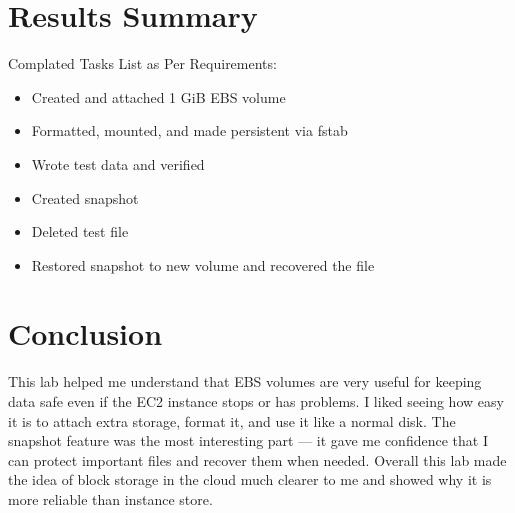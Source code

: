 \documentclass[12pt,a4paper]{article}
\begin{document}
\section*{Results Summary}
Complated Tasks List as Per Requirements:
\begin{itemize}
    \item Created and attached 1 GiB EBS volume
    \item Formatted, mounted, and made persistent via fstab
    \item Wrote test data and verified
    \item Created snapshot
    \item Deleted test file
    \item Restored snapshot to new volume and recovered the file
\end{itemize}
\section*{Conclusion}
This lab helped me understand that EBS volumes are very useful for keeping data safe even if the EC2 instance stops or has problems. I liked seeing how easy it is to attach extra storage, format it, and use it like a normal disk. The snapshot feature was the most interesting part — it gave me confidence that I can protect important files and recover them when needed. Overall this lab made the idea of block storage in the cloud much clearer to me and showed why it is more reliable than instance store.
\end{document}

